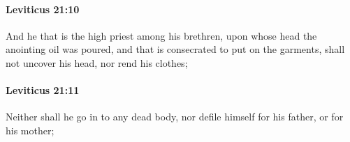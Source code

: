 		\paragraph{Leviticus 21:10} %
			\label{LEVITICUS-21-10}

			And he that is the high priest among his brethren, upon whose head the anointing oil was poured, and that is consecrated to put on the garments, shall not uncover his head, nor rend his clothes;


		\paragraph{Leviticus 21:11} %
			\label{LEVITICUS-21-11}

			Neither shall he go in to any dead body, nor defile himself for his father, or for his mother;


